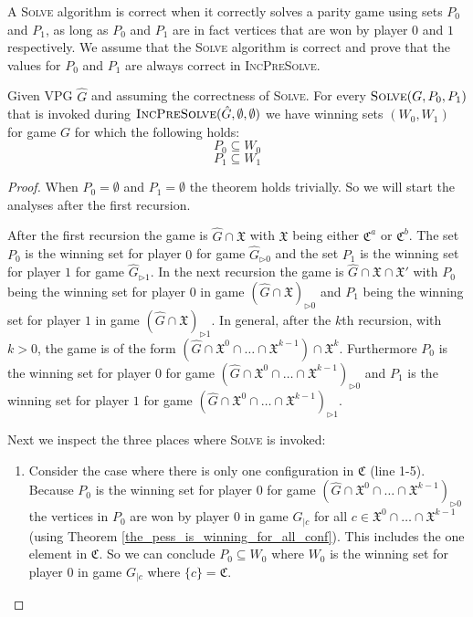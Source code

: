 A \textsc{Solve} algorithm is correct when it correctly solves a parity game using sets $P_0$ and $P_1$, as long as $P_0$ and $P_1$ are in fact vertices that are won by player $0$ and $1$ respectively. We assume that the \textsc{Solve} algorithm is correct and prove that the values for $P_0$ and $P_1$ are always correct in \textsc{IncPreSolve}.
\begin{lemma}
	Given VPG $\hat{G}$ and assuming the correctness of \textsc{Solve}. For every $\textsc{Solve}(G,P_0,P_1)$ that is invoked during $\textsc{IncPreSolve}(\hat{G},\emptyset,\emptyset)$ we have winning sets $(W_0,W_1)$ for game $G$ for which the following holds:
	\[ P_0 \subseteq  W_0 \]
	\[ P_1 \subseteq  W_1 \]
	\begin{proof}
		\label{lem_P0_and_P1_are_always_correct}
		When $P_0 = \emptyset$ and $P_1 = \emptyset$ the theorem holds trivially. So we will start the analyses after the first recursion. 
		
		After the first recursion the game is $\hat{G} \cap \mathfrak{X}$ with $\mathfrak{X}$ being either $\mathfrak{C}^a$ or $\mathfrak{C}^b$. The set $P_0$ is the winning set for player $0$ for game $\hat{G}_{\triangleright0}$ and the set $P_1$ is the winning set for player $1$ for game $\hat{G}_{\triangleright1}$. In the next recursion the game is $\hat{G} \cap \mathfrak{X} \cap \mathfrak{X}'$ with $P_0$ being the winning set for player $0$ in game $(\hat{G} \cap \mathfrak{X})_{\triangleright0}$ and $P_1$ being the winning set for player $1$ in game $(\hat{G} \cap \mathfrak{X})_{\triangleright1}$. In general, after the $k$th recursion, with $k > 0$, the game is of the form  $(\hat{G} \cap \mathfrak{X}^0 \cap \dots \cap \mathfrak{X}^{k-1}) \cap \mathfrak{X}^k$. Furthermore $P_0$ is the winning set for player $0$ for game $(\hat{G} \cap \mathfrak{X}^0 \cap \dots \cap \mathfrak{X}^{k-1})_{\triangleright0}$ and $P_1$ is the winning set for player $1$ for game $(\hat{G} \cap \mathfrak{X}^0 \cap \dots \cap \mathfrak{X}^{k-1})_{\triangleright1}$.
		
		Next we inspect the three places where \textsc{Solve} is invoked:
		\begin{enumerate}
			\item Consider the case where there is only one configuration in $\mathfrak{C}$ (line 1-5). Because $P_0$ is the winning set for player $0$ for game $(\hat{G} \cap \mathfrak{X}^0 \cap \dots \cap \mathfrak{X}^{k-1})_{\triangleright0}$ the vertices in $P_0$ are won by player $0$ in game $G_{|c}$ for all $c \in \mathfrak{X}^0 \cap \dots \cap \mathfrak{X}^{k-1}$ (using Theorem \ref{the_pess_is_winning_for_all_conf}). This includes the one element in $\mathfrak{C}$. So we can conclude $P_0 \subseteq W_0$ where $W_0$ is the winning set for player $0$ in game $G_{|c}$ where $\{c\} = \mathfrak{C}$.
			

\end{enumerate}
\end{proof}
\end{lemma}

